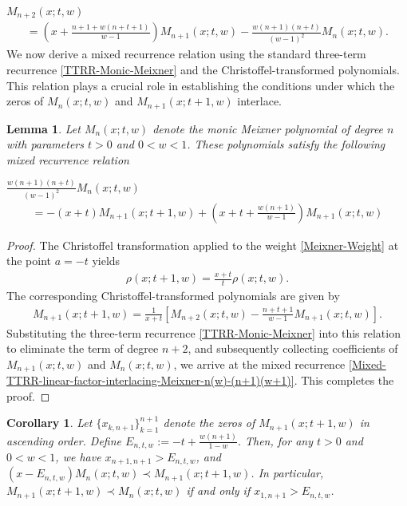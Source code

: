 \documentclass[final,3p,times,12pt]{elsarticle}
\newtheorem{lemma}{Lemma}[section]
\newtheorem{corollary}{Corollary}[section]
\numberwithin{equation}{section}  %
\begin{document}
$\displaystyle  M_{n+2}(x; t, w)$
\begin{align} \label{TTRR-Monic-Meixner}
	=
	\left(x+\frac{n+1+w(n+t+1)}{w-1}\right) M_{n+1}(x; t, w) -\frac{w(n+1)(n+t)}{(w-1)^2} M_{n}(x; t, w).
\end{align}
We now derive a mixed recurrence relation using the standard three-term recurrence \eqref{TTRR-Monic-Meixner} and the Christoffel-transformed polynomials. This relation plays a crucial role in establishing the conditions under which the zeros of $M_{n}(x; t, w)$ and $M_{n+1}(x; t+1, w)$  interlace.

\begin{lemma}
	Let  $M_{n}(x; t, w)$ denote the monic Meixner polynomial of degree $n$ with parameters $t>0$ and $0<w<1$.	These polynomials satisfy the following mixed recurrence relation
	
	$\displaystyle \frac{w(n+1)(n+t)}{(w-1)^2} M_n(x; t, w)$
	\begin{align} \label{Mixed-TTRR-linear-factor-interlacing-Meixner-n(w)-(n+1)(w+1)}
		=
		- (x+t) M_{n+1}(x; t+1, w) +\left(x+t + \frac{w(n+1)}{w-1} \right) M_{n+1}(x; t, w) 
	\end{align}
\end{lemma}
\begin{proof}
	The Christoffel transformation \cite[page 35]{Chiharabook} applied to the weight \eqref{Meixner-Weight} at the point $a = -t$ yields
	\begin{align}\label{Christoffel-Weight-Meixner}
		\rho(x; t+1, w) = \frac{x + t}{t} \rho(x; t, w).
	\end{align}
	The corresponding Christoffel-transformed polynomials are given by
	\begin{align*}
		M_{n+1}(x; t+1, w) = \frac{1}{x + t} \left[ M_{n+2}(x; t, w) - \frac{n + t + 1}{w - 1} M_{n+1}(x; t, w) \right].
	\end{align*}
	Substituting the three-term recurrence \eqref{TTRR-Monic-Meixner} into this relation to eliminate the term of degree $n+2$, and subsequently collecting coefficients of $M_{n+1}(x; t, w)$ and $M_n(x; t, w)$, we arrive at the mixed recurrence \eqref{Mixed-TTRR-linear-factor-interlacing-Meixner-n(w)-(n+1)(w+1)}. This completes the proof.
\end{proof}
\begin{corollary}
	Let $\{x_{k,n+1}\}_{k=1}^{n+1}$ denote the zeros of $M_{n+1}(x; t+1, w)$ in ascending order. Define
	$
	E_{n,t,w} := -t + \frac{w(n+1)}{1-w}.
	$
	Then, for any $t > 0$ and $0 < w < 1$, we have $x_{n+1,n+1} > E_{n,t,w}$, and $(x - E_{n,t,w}) M_{n}(x; t, w)\prec M_{n+1}(x; t+1, w)$. In particular, $ M_{n+1}(x; t+1, w)\prec M_{n}(x; t, w)$ if and only if  $x_{1,n+1}>E_{n,t,w}$.
\end{corollary} 
\end{document}
